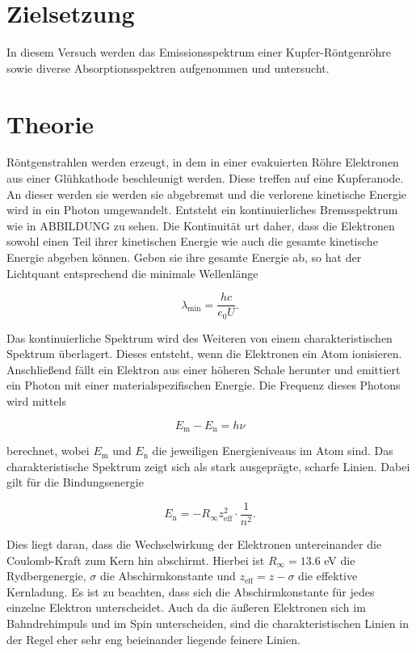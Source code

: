 \section{Zielsetzung}
In diesem Versuch werden das Emissionsspektrum einer Kupfer-Röntgenröhre sowie diverse Absorptionsspektren aufgenommen und untersucht.

\section{Theorie}
\label{sec:Theorie}

Röntgenstrahlen werden erzeugt, in dem in einer evakuierten Röhre Elektronen aus einer Glühkathode beschleunigt werden.
Diese treffen auf eine Kupferanode. An dieser werden sie werden sie abgebremst und die verlorene kinetische Energie wird in ein Photon umgewandelt. Entsteht ein kontinuierliches Bremsspektrum wie in ABBILDUNG zu sehen.
Die Kontinuität urt daher, dass die Elektronen sowohl einen Teil ihrer kinetischen Energie wie auch die gesamte kinetische Energie abgeben können.
Geben sie ihre gesamte Energie ab, so hat der Lichtquant entsprechend die minimale Wellenlänge

\begin{equation}
    \label{eqn:lambda-min}
    \lambda_\text{min} = \frac{h c}{e_0 U}.
\end{equation}

Das kontinuierliche Spektrum wird des Weiteren von einem charakteristischen Spektrum überlagert.
Dieses entsteht, wenn die Elektronen ein Atom ionisieren. Anschließend fällt ein Elektron aus einer höheren Schale herunter und emittiert ein Photon mit einer materialspezifischen Energie.
Die Frequenz dieses Photons wird mittels

\begin{equation}
    \label{eqn:schalen}
    E_\text{m} - E_\text{n} = h \nu
\end{equation}

berechnet, wobei $E_\text{m}$ und $E_\text{n}$ die jeweiligen Energieniveaus im Atom sind.
Das charakteristische Spektrum zeigt sich als stark ausgeprägte, scharfe Linien.
Dabei gilt für die Bindungsenergie

\begin{equation}
    \label{eqn:Bindungsenergie}
    E_\text{n} = -R_\infty z_\text{eff}^2 \cdot \frac{1}{n^2}.
\end{equation}

Dies liegt daran, dass die Wechselwirkung der Elektronen untereinander die Coulomb-Kraft zum Kern hin abschirmt.
Hierbei ist $R_\infty = 13.6$ eV die Rydbergenergie, $\sigma$ die Abschirmkonstante und $z_\text{eff} = z - \sigma$ die effektive Kernladung.
Es ist zu beachten, dass sich die Abschirmkonstante für jedes einzelne Elektron unterscheidet.
Auch da die äußeren Elektronen sich im Bahndrehimpuls und im Spin unterscheiden, sind die charakteristischen Linien in der Regel eher sehr eng beieinander liegende feinere Linien.

